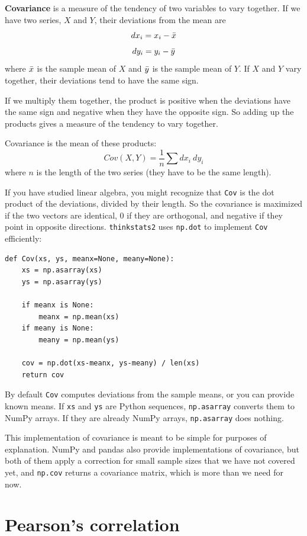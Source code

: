\documentclass[12pt]{book}
\begin{document}
{\bf Covariance} is a measure of the tendency of two variables
to vary together.  If we have two series, $X$ and $Y$, their
deviations from the mean are
%
\[ dx_i = x_i - \bar{x} \]
\[ dy_i = y_i - \bar{y} \]
%
where $\bar{x}$ is the sample mean of $X$ and $\bar{y}$ is the sample mean
of $Y$.  If $X$ and $Y$ vary together, their deviations tend to have
the same sign.

If we multiply them together, the product is positive when the
deviations have the same sign and negative when they have the opposite
sign.  So adding up the products gives a measure of the tendency to
vary together.

Covariance is the mean of these products:
%
\[ Cov(X,Y) = \frac{1}{n} \sum dx_i~dy_i \]
%
where $n$ is the length of the two series (they have to be the same
length).

If you have studied linear algebra, you might recognize that
{\tt Cov} is the dot product of the deviations, divided
by their length.  So the covariance is maximized if the two vectors
are identical, 0 if they are orthogonal, and negative if they
point in opposite directions.  {\tt thinkstats2} uses {\tt np.dot} to
implement {\tt Cov} efficiently:

\begin{verbatim}
def Cov(xs, ys, meanx=None, meany=None):
    xs = np.asarray(xs)
    ys = np.asarray(ys)

    if meanx is None:
        meanx = np.mean(xs)
    if meany is None:
        meany = np.mean(ys)

    cov = np.dot(xs-meanx, ys-meany) / len(xs)
    return cov
\end{verbatim}

By default {\tt Cov} computes deviations from the sample means,
or you can provide known means.  If {\tt xs} and {\tt ys} are
Python sequences, {\tt np.asarray} converts them to NumPy arrays.
If they are already NumPy arrays, {\tt np.asarray} does nothing.

This implementation of covariance is meant to be simple for purposes
of explanation.  NumPy and pandas also provide implementations of
covariance, but both of them apply a correction for small sample sizes
that we have not covered yet, and {\tt np.cov} returns a covariance
matrix, which is more than we need for now.


\section{Pearson's correlation}
\end{document}
